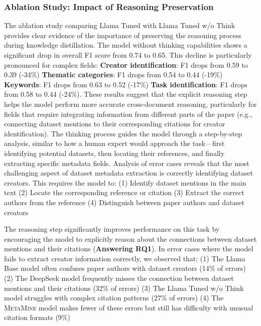 \documentclass[runningheads]{llncs}
\begin{document}
\subsubsection{Ablation Study: Impact of Reasoning Preservation}
The ablation study comparing Llama Tuned with Llama Tuned w/o Think provides clear evidence of the importance of preserving the reasoning process during knowledge distillation. The model without thinking capabilities shows a significant drop in overall F1 score from 0.74 to 0.65. This decline is particularly pronounced for complex fields:
    \textbf{ Creator identification}: F1 drops from 0.59 to 0.39 (-34\%)
    \textbf{ Thematic categories}: F1 drops from 0.54 to 0.44 (-19\%)
    \textbf{ Keywords}: F1 drops from 0.63 to 0.52 (-17\%)
    \textbf{ Task identification}: F1 drops from 0.58 to 0.44 (-24\%).
These results suggest that the explicit reasoning step helps the model perform more accurate cross-document reasoning, particularly for fields that require integrating information from different parts of the paper (e.g., connecting dataset mentions to their corresponding citations for creator identification). The thinking process guides the model through a step-by-step analysis, similar to how a human expert would approach the task—first identifying potential datasets, then locating their references, and finally extracting specific metadata fields.
Analysis of error cases reveals that the most challenging aspect of dataset metadata extraction is correctly identifying dataset creators. This requires the model to:
     (1) Identify dataset mentions in the main text
     (2) Locate the corresponding reference or citation
     (3) Extract the correct authors from the reference
     (4) Distinguish between paper authors and dataset creators


The reasoning step significantly improves performance on this task by encouraging the model to explicitly reason about the connections between dataset mentions and their citations (\textbf{Answering RQ1}). In error cases where the model fails to extract creator information correctly, we observed that:
     (1) The Llama Base model often confuses paper authors with dataset creators (14\% of errors)
     (2) The DeepSeek model frequently misses the connection between dataset mentions and their citations (32\% of errors)
     (3) The Llama Tuned w/o Think model struggles with complex citation patterns (27\% of errors)
     (4) The \textsc{MetaMine} model makes fewer of these errors but still has difficulty with unusual citation formats (9\%)
\end{document}
